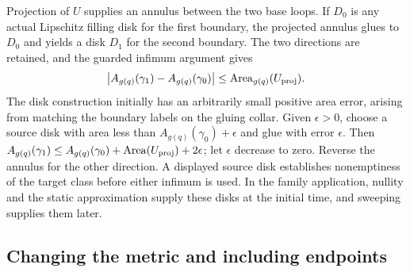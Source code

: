 \begin{lemma}\label{lem:annular-disk-gluing}
Projection of $U$ supplies an annulus between the two base loops.  If $D_0$
is any actual Lipschitz filling disk for the first boundary, the projected
annulus glues to $D_0$ and yields a disk $D_1$ for the second boundary.  The
two directions are retained, and the guarded infimum argument gives
\begin{equation}
 \left|A_{g(q)}(\gamma_1)-A_{g(q)}(\gamma_0)\right|
 \le \operatorname{Area}_{g(q)}(U_{\rm proj}).
 \label{eq:disk-gluing}
\end{equation}
The disk construction initially has an arbitrarily small positive area
error, arising from matching the boundary labels on the gluing collar.
Given $\epsilon>0$, choose a source disk with area less than
$A_{g(q)}(\gamma_0)+\epsilon$ and glue with error $\epsilon$.
Then $A_{g(q)}(\gamma_1)\le A_{g(q)}(\gamma_0)+
\operatorname{Area}(U_{\rm proj})+2\epsilon$; let $\epsilon$ decrease to
zero.  Reverse the annulus for the other direction.  A displayed source
disk establishes nonemptiness of the target class before either infimum
is used.  In the family application, nullity and the static approximation
supply these disks at the initial time, and sweeping supplies them later.
\end{lemma}

\subsection{Changing the metric and including endpoints}

